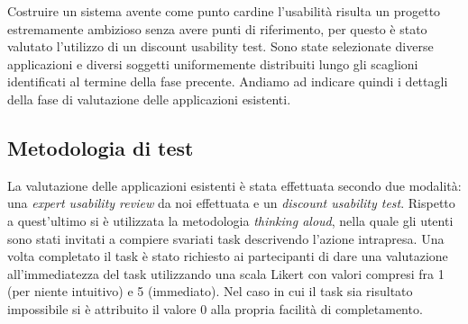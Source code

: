
Costruire un sistema avente come punto cardine l'usabilità risulta un progetto
estremamente ambizioso senza avere punti di riferimento, per questo è stato
valutato l'utilizzo di un discount usability test.  Sono state selezionate
diverse applicazioni e diversi soggetti uniformemente distribuiti lungo gli
scaglioni identificati al termine della fase precente.  Andiamo ad indicare
quindi i dettagli della fase di valutazione delle applicazioni esistenti.

\subsection{Metodologia di test}
La valutazione delle applicazioni esistenti è stata effettuata secondo due
modalità: una \emph{expert usability review} da noi effettuata e un
\emph{discount usability test}.  Rispetto a quest'ultimo si è utilizzata la
metodologia \emph{thinking aloud}, nella quale gli utenti sono stati invitati a
compiere svariati task descrivendo l'azione intrapresa.  Una volta completato il
task è stato richiesto ai partecipanti di dare una valutazione all'immediatezza
del task utilizzando una scala Likert con valori compresi fra 1 (per niente
intuitivo) e 5 (immediato).  Nel caso in cui il task sia risultato impossibile
si è attribuito il valore 0 alla propria facilità di completamento.
